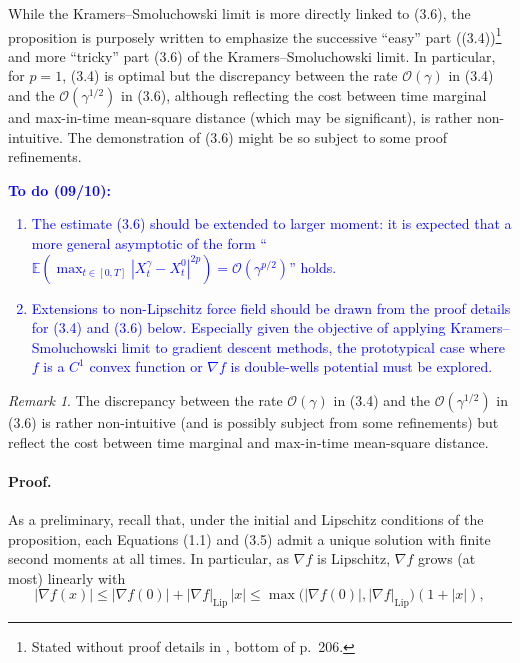 \documentclass[11pt]{article}
\theoremstyle{remark}
\newtheorem{remark}{Remark}
\begin{document}
While the Kramers--Smoluchowski limit is more directly linked to (3.6), the proposition is purposely written to emphasize the successive ``easy'' part ((3.4))\footnote{Stated without proof details in \cite{8}, bottom of p.~206.} and more ``tricky'' part (3.6) of the Kramers--Smoluchowski limit.
In particular, for $p=1$, (3.4) is optimal but the discrepancy between the rate $\mathcal{O}(\gamma)$ in (3.4) and the $\mathcal{O}(\gamma^{1/2})$ in (3.6), although reflecting the cost between time marginal and max-in-time mean-square distance (which may be significant), is rather non-intuitive.
The demonstration of (3.6) might be so subject to some proof refinements.

\textcolor{blue}{\textbf{To do (09/10):}
\begin{enumerate}
\item The estimate (3.6) should be extended to larger moment: it is expected that a more general asymptotic of the form ``$\mathbb{E}(\max_{t\in[0,T]}|X_t^\gamma-X_t^0|^{2p})=\mathcal{O}(\gamma^{p/2})$'' holds.
\item Extensions to non-Lipschitz force field should be drawn from the proof details for (3.4) and (3.6) below. Especially given the objective of applying Kramers--Smoluchowski limit to gradient descent methods, the prototypical case where $f$ is a $C^1$ convex function or $\nabla f$ is double-wells potential must be explored.
\end{enumerate}}

\begin{remark}
The discrepancy between the rate $\mathcal{O}(\gamma)$ in (3.4) and the $\mathcal{O}(\gamma^{1/2})$ in (3.6) is rather non-intuitive (and is possibly subject from some refinements) but reflect the cost between time marginal and max-in-time mean-square distance.
\end{remark}

\paragraph{Proof.}
As a preliminary, recall that, under the initial and Lipschitz conditions of the proposition, each Equations (1.1) and (3.5) admit a unique solution with finite second moments at all times.
In particular, as $\nabla f$ is Lipschitz, $\nabla f$ grows (at most) linearly with
\begin{equation}
|\nabla f(x)| \le |\nabla f(0)| + |\nabla f|_{\mathrm{Lip}}\,|x|
\le \max\!\big(|\nabla f(0)|,|\nabla f|_{\mathrm{Lip}}\big)(1+|x|),
\tag{3.7}
\end{equation}
\end{document}
